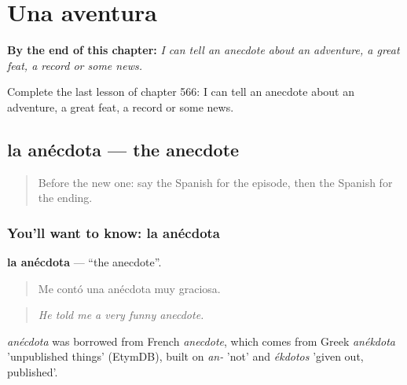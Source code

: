 
\chapter{Una aventura}
\label{ch:es-una-aventura}

\begin{chapteropening}
\textbf{By the end of this chapter:} \emph{I can tell an anecdote about an adventure, a great feat, a record or some news.}

Complete the last lesson of chapter 566: I can tell an anecdote about an adventure, a great feat, a record or some news.
\end{chapteropening}

\section[la anécdota]{la anécdota — the anecdote}

\label{lesson:ES-C566-anecdota}



\begin{quote}
Before the new one: say the Spanish for the episode, then the Spanish for the ending.
\end{quote}

\subsection*{You'll want to know: la anécdota}
\textbf{la anécdota} — \textquotedblleft{}the anecdote\textquotedblright{}.

\begin{quote}
Me contó una anécdota muy graciosa.
\end{quote}

\begin{quote}
\emph{He told me a very funny anecdote.}
\end{quote}

\begin{cousinweb}
\emph{anécdota} was borrowed from French \emph{anecdote}, which comes from Greek \emph{anékdota} 'unpublished things' (EtymDB), built on \emph{an-} 'not' and \emph{ékdotos} 'given out, published'.
\end{cousinweb}

